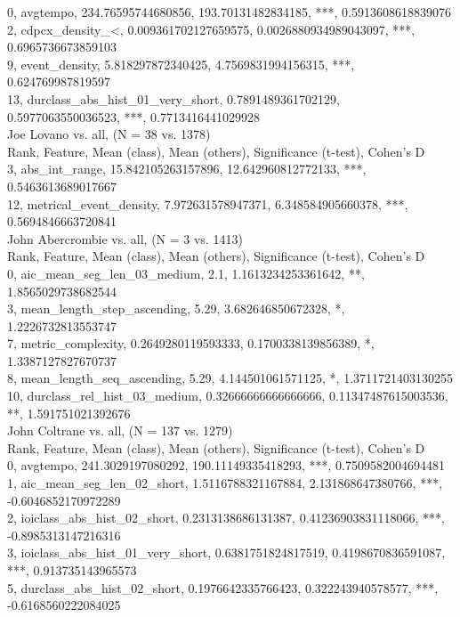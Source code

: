 0, avgtempo, 234.76595744680856, 193.70131482834185, ***, 0.5913608618839076\\
2, cdpcx_density_<, 0.009361702127659575, 0.0026880934989043097, ***, 0.6965736673859103\\
9, event_density, 5.818297872340425, 4.7569831994156315, ***, 0.624769987819597\\
13, durclass_abs_hist_01_very_short, 0.7891489361702129, 0.5977063550036523, ***, 0.7713416441029928\\
Joe Lovano vs. all, (N = 38 vs. 1378)\\
Rank, Feature, Mean (class), Mean (others), Significance (t-test), Cohen's D\\
3, abs_int_range, 15.842105263157896, 12.642960812772133, ***, 0.5463613689017667\\
12, metrical_event_density, 7.972631578947371, 6.348584905660378, ***, 0.5694846663720841\\
John Abercrombie vs. all, (N = 3 vs. 1413)\\
Rank, Feature, Mean (class), Mean (others), Significance (t-test), Cohen's D\\
0, aic_mean_seg_len_03_medium, 2.1, 1.1613234253361642, **, 1.8565029738682544\\
3, mean_length_step_ascending, 5.29, 3.682646850672328, *, 1.2226732813553747\\
7, metric_complexity, 0.2649280119593333, 0.1700338139856389, *, 1.3387127827670737\\
8, mean_length_seq_ascending, 5.29, 4.144501061571125, *, 1.3711721403130255\\
10, durclass_rel_hist_03_medium, 0.32666666666666666, 0.11347487615003536, **, 1.591751021392676\\
John Coltrane vs. all, (N = 137 vs. 1279)\\
Rank, Feature, Mean (class), Mean (others), Significance (t-test), Cohen's D\\
0, avgtempo, 241.3029197080292, 190.11149335418293, ***, 0.7509582004694481\\
1, aic_mean_seg_len_02_short, 1.5116788321167884, 2.131868647380766, ***, -0.6046852170972289\\
2, ioiclass_abs_hist_02_short, 0.2313138686131387, 0.41236903831118066, ***, -0.8985313147216316\\
3, ioiclass_abs_hist_01_very_short, 0.6381751824817519, 0.4198670836591087, ***, 0.913735143965573\\
5, durclass_abs_hist_02_short, 0.1976642335766423, 0.322243940578577, ***, -0.6168560222084025\\
